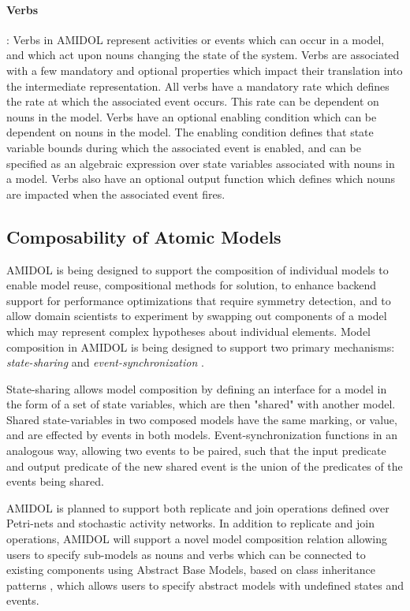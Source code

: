 \documentclass[11pt]{article}
\newcommand{\amidol}{\textsc{AMIDOL}}
\begin{document}
\paragraph{Verbs}: Verbs in \amidol{} represent activities or events which can occur in a model, and which act upon nouns changing the state of the system.  Verbs are associated with a few mandatory and optional properties which impact their translation into the intermediate representation.  All verbs have a mandatory rate which defines the rate at which the associated event occurs.  This rate can be dependent on nouns in the model.  Verbs have an optional enabling condition which can be dependent on nouns in the model.  The enabling condition defines that state variable bounds during which the associated event is enabled, and can be specified as an algebraic expression over state variables associated with nouns in a model.  Verbs also have an optional output function which defines which nouns are impacted when the associated event fires.

\subsection{Composability of Atomic Models}

\amidol{} is being designed to support the composition of individual models to enable model reuse, compositional methods for solution, to enhance backend support for performance optimizations that require symmetry detection, and to allow domain scientists to experiment by swapping out components of a model which may represent complex hypotheses about individual elements.  Model composition in \amidol{} is being designed to support two primary mechanisms: \emph{state-sharing} \cite{sanders1992dependability,sanders1988construction} and \emph{event-synchronization} \cite{lampka2002symbolic}.

State-sharing allows model composition by defining an interface for a model in the form of a set of state variables, which are then "shared" with another model.  Shared state-variables in two composed models have the same marking, or value, and are effected by events in both models.  Event-synchronization functions in an analogous way, allowing two events to be paired, such that the input predicate and output predicate of the new shared event is the union of the predicates of the events being shared.

\amidol{} is planned to support both replicate and join operations defined over Petri-nets and stochastic activity networks. \cite{sanders1995ultrasan}  In addition to replicate and join operations, \amidol{} will support a novel model composition relation allowing users to specify sub-models as nouns and verbs which can be connected to existing components using Abstract Base Models, based on class inheritance patterns \cite{bruce2002foundations}, which allows users to specify abstract models with undefined states and events.
\end{document}

